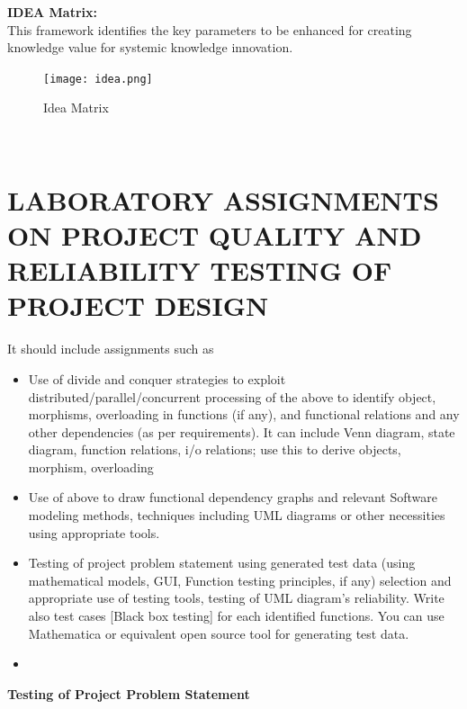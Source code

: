 \documentclass[oneside,a4paper,12pt]{report}
\begin{document}
\begin{appendices}
\begin{itemize}
\textbf{IDEA Matrix:}\\
\hspace*{0.3 in} This framework identifies the key parameters to be enhanced for creating knowledge value for systemic knowledge innovation.\\
\begin{figure}[!h]
\centering
\texttt{[image: idea.png]}
\caption{Idea Matrix}
\end{figure}
\\





\chapter{LABORATORY ASSIGNMENTS ON PROJECT QUALITY AND RELIABILITY TESTING OF PROJECT DESIGN}
\newpage

\hspace*{0.3in}It should include assignments such as\\ 
\begin{itemize}
\item
Use of divide and conquer strategies to exploit distributed/parallel/concurrent
processing of the above to identify object, morphisms, overloading in
functions (if any), and functional relations and any other dependencies
(as per requirements). It can include Venn diagram, state diagram, function
relations, i/o relations; use this to derive objects, morphism, overloading
\item
Use of above to draw functional dependency graphs and relevant Software
modeling methods, techniques including UML diagrams or other
necessities using appropriate tools.
\item
Testing of project problem statement using generated test data (using
mathematical models, GUI, Function testing principles, if any) selection
and appropriate use of testing tools, testing of UML diagram’s reliability.
Write also test cases [Black box testing] for each identified functions. You can use Mathematica or equivalent open source tool for
generating test data.
\item 


\end{itemize}


\textbf{Testing of Project Problem Statement}\\


\end{itemize}
\end{appendices}
\end{document}
